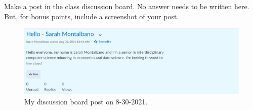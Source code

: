 \documentclass{article}
\begin{document}

Make a post in the class discussion board. No answer needs to be written here.
But, for bonus points, include a screenshot of your post.

\begin{figure}
  \includegraphics[width=\linewidth]{discussion_board_intro_screenshot.png}
  \caption{My discussion board post on 8-30-2021.}
  \label{fig:screenshot}
\end{figure}

\end{document}
